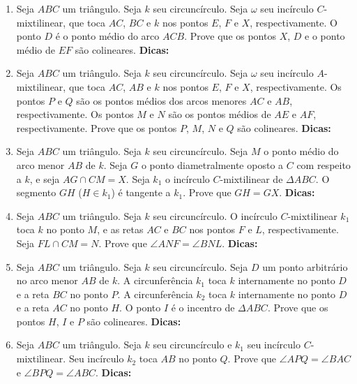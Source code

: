 \documentclass{article}
\newcommand{\dica}{\textbf{Dicas:}}
\newcommand{\iniTri}{Seja $ABC$ um triângulo}
\begin{document}
\begin{multicols}{2}
\begin{enumerate}
    \item \iniTri. Seja $k$ seu circuncírculo. Seja $\omega$ seu incírculo $C$-mixtilinear, que toca $AC$, $BC$ e $k$ nos pontos $E$, $F$ e $X$, respectivamente. O ponto $D$ é o ponto médio do arco $ACB$. Prove que os pontos $X$, $D$ e o ponto médio de $EF$ são colineares. \dica %
    
    \item \iniTri. Seja $k$ seu circuncírculo. Seja $\omega$ seu incírculo $A$-mixtilinear, que toca $AC$, $AB$ e $k$ nos pontos $E$, $F$ e $X$, respectivamente. Os pontos $P$ e $Q$ são os pontos médios dos arcos menores $AC$ e $AB$, respectivamente. Os pontos $M$ e $N$ são os pontos médios de $AE$ e $AF$, respectivamente. Prove que os pontos $P$, $M$, $N$ e $Q$ são colineares. \dica %
    
    \item \iniTri. Seja $k$ seu circuncírculo. Seja $M$ o ponto médio do arco menor $AB$ de $k$. Seja $G$ o ponto diametralmente oposto a $C$ com respeito a $k$, e seja $AG\cap CM=X$. Seja $k_1$ o incírculo $C$-mixtilinear de $\Delta ABC$. O segmento $GH$ ($H\in k_1$) é tangente a $k_1$. Prove que $GH=GX$. \dica %
    
    \item \iniTri. Seja $k$ seu circuncírculo. O incírculo $C$-mixtilinear $k_1$ toca $k$ no ponto $M$, e as retas $AC$ e $BC$ nos pontos $F$ e $L$, respectivamente. Seja $FL\cap CM=N$. Prove que $\angle ANF=\angle BNL$. \dica %
    
    \item \iniTri. Seja $k$ seu circuncírculo. Seja $D$ um ponto arbitrário no arco menor $AB$ de $k$. A circunferência $k_1$ toca $k$ internamente no ponto $D$ e a reta $BC$ no ponto $P$. A circunferência $k_2$ toca $k$ internamente no ponto $D$ e a reta $AC$ no ponto $H$. O ponto $I$ é o incentro de $\Delta ABC$. Prove que os pontos $H$, $I$ e $P$ são colineares. \dica %
    
    \item \iniTri. Seja $k$ seu circuncírculo e $k_1$ seu incírculo $C$-mixtilinear. Seu incírculo $k_2$ toca $AB$ no ponto $Q$. Prove que $\angle APQ=\angle BAC$ e $\angle BPQ=\angle ABC$. \dica %
    

\end{enumerate}
\end{multicols}
\end{document}
